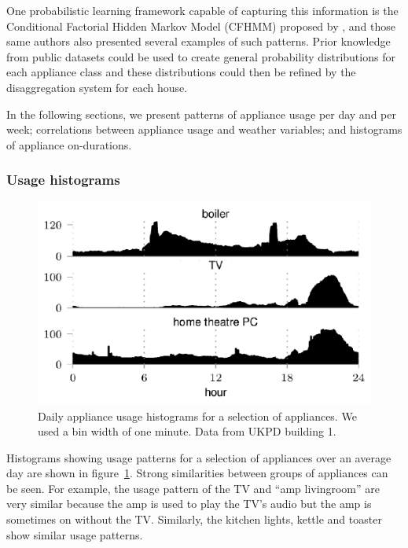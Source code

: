 \documentclass{sig-alternate}
\begin{document}
One probabilistic learning framework capable of capturing this
information is the Conditional Factorial Hidden Markov Model (CFHMM)
proposed by \cite{kim_2011}, and those same authors also presented
several examples of such patterns.  Prior knowledge from
public datasets could be used to create general probability
distributions for each appliance class and these distributions could
then be refined by the disaggregation system for each house.

In the following sections, we present patterns of appliance usage per
day and per week; correlations between appliance usage and weather
variables; and histograms of appliance on-durations. 

\subsubsection{Usage histograms}

\begin{figure}[!t]
  \centering
  \includegraphics[width=\columnwidth]{figures/daily_usage_histograms2.pdf}
  \caption{Daily appliance usage histograms for a selection of
    appliances.  We used a bin width of one minute.  Data from UKPD
    building 1.}
  \label{fig:daily_usage_histograms}
\end{figure} 

\noindent
Histograms showing usage patterns for a selection of appliances over
an average day are shown in figure~\ref{fig:daily_usage_histograms}.
Strong similarities between groups of appliances can be seen.  For
example, the usage pattern of the TV and ``amp livingroom'' are very
similar because the amp is used to play the TV's audio but the amp is
sometimes on without the TV.  Similarly, the kitchen lights, kettle
and toaster show similar usage patterns.
\end{document}

